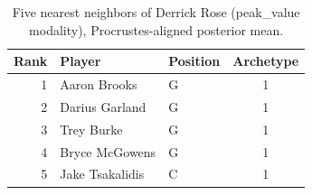 \begin{table}[htbp]
  \centering\small
  \begin{tabular}{rllc}
    \toprule
    Rank & Player & Position & Archetype \\
    \midrule
    1 & Aaron Brooks & G & 1 \\
    2 & Darius Garland & G & 1 \\
    3 & Trey Burke & G & 1 \\
    4 & Bryce McGowens & G & 1 \\
    5 & Jake Tsakalidis & C & 1 \\
    \bottomrule
  \end{tabular}
  \caption{Five nearest neighbors of Derrick Rose (peak_value modality), Procrustes-aligned posterior mean.}
  \label{tab:Derrick_Rose_neighbors_peak_value}
\end{table}

